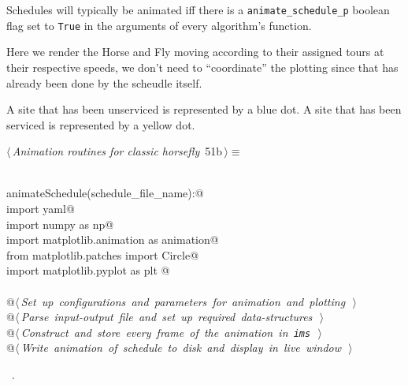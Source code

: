 \documentclass[11.5pt]{report}
\begin{document}
Schedules will typically be animated iff there is a \verb|animate_schedule_p| boolean 
flag set to \verb|True| in the arguments of every algorithm's function. 

Here we render the Horse and Fly moving according to their 
assigned tours at their respective speeds, we don't 
need to ``coordinate'' the plotting since that has already 
been done by the scheudle itself. 
    
A site that has been unserviced is represented by a blue dot. 
A site that has been serviced is represented by a yellow dot. 
   

\begin{flushleft} \small
\begin{minipage}{\linewidth}\label{scrap82}\raggedright\small
{} $\langle\,${\itshape Animation routines for classic horsefly}\nobreak\ {\footnotesize {51b}}$\,\rangle\equiv$
\vspace{-1ex}
\begin{list}{}{} \item
\mbox{}\verb@@\\
\mbox{}\verb@def animateSchedule(schedule_file_name):@\\
\mbox{}\verb@     import yaml@\\
\mbox{}\verb@     import numpy as np@\\
\mbox{}\verb@     import matplotlib.animation as animation@\\
\mbox{}\verb@     from matplotlib.patches import Circle@\\
\mbox{}\verb@     import matplotlib.pyplot as plt @\\
\mbox{}\verb@@\\
\mbox{}\verb@     @\hbox{$\langle\,${\itshape Set up configurations and parameters for animation and plotting}\nobreak\ {\footnotesize {}}$\,\rangle$}\verb@@\\
\mbox{}\verb@     @\hbox{$\langle\,${\itshape Parse input-output file and set up required data-structures}\nobreak\ {\footnotesize {}}$\,\rangle$}\verb@@\\
\mbox{}\verb@     @\hbox{$\langle\,${\itshape Construct and store every frame of the animation in \verb|ims|}\nobreak\ {\footnotesize {}}$\,\rangle$}\verb@@\\
\mbox{}\verb@     @\hbox{$\langle\,${\itshape Write animation of schedule to disk and display in live window}\nobreak\ {\footnotesize {}}$\,\rangle$}\verb@@\\
\mbox{}\verb@@{\NWsep}
\end{list}
\vspace{-1.5ex}
\footnotesize
\begin{list}{}{\setlength{\itemsep}{-\parsep}\setlength{\itemindent}{-\leftmargin}}
\item \NWtxtMacroRefIn\ .

\item{}
\end{list}
\end{minipage}\vspace{4ex}
\end{flushleft}
\end{document}
